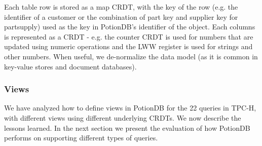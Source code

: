 \documentclass[sigplan,review,anonymous]{acmart}
\newcommand{\nuno}[1]{\nbnote{Nuno}{red}{#1}}
\begin{document}
Each table row is stored as a map CRDT, with the key of the row (e.g. the identifier of a customer or the combination of part key and supplier key for partsupply) used as the key in PotionDB's identifier of the object. 
Each columns is represented as a CRDT - e.g. the counter CRDT is used for numbers that are updated using numeric operations and the
LWW register is used for strings and other numbers.
When useful, we de-normalize the data model (as it is common in key-value stores and document databases). 

\subsubsection{Views}
\label{subsec:views_for_queries}

%

We have analyzed how to define views in PotionDB for the 22 queries in TPC-H, with different views using different
underlying CRDTs.
We now describe the lessons learned. In the next section we present the evaluation of how PotionDB performs on supporting
 different types of queries.
\end{document}
